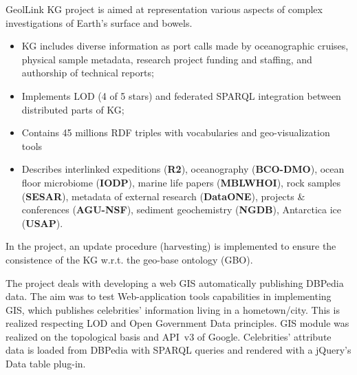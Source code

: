 \documentclass[
]{ceurart}
\begin{document}
  GeolLink KG project \cite{geolink} is aimed at representation various aspects of complex investigations of Earth's surface and bowels.
  \begin{itemize}
  \item KG includes diverse information as port calls made by oceanographic cruises, physical sample metadata, research project funding and staffing, and authorship of technical reports;
  \item Implements LOD (4 of 5 stars) and federated SPARQL integration between distributed parts of KG;
  \item Contains 45 millions RDF triples with vocabularies and geo-visualization tools
  \item Describes interlinked expeditions (\textbf{R2}), oceanography (\textbf{BCO-DMO}), ocean floor microbiome (\textbf{IODP}), marine life papers (\textbf{MBLWHOI}), rock samples (\textbf{SESAR}), metadata of external research (\textbf{DataONE}),  projects \& conferences (\textbf{AGU-NSF}), sediment geochemistry (\textbf{NGDB}), Antarctica ice (\textbf{USAP}).
  \end{itemize}
  In the project, an update procedure (harvesting) is implemented to ensure the consistence of the KG w.r.t. the geo-base ontology (GBO).

   The project \cite{abid} deals with developing a web GIS automatically publishing DBPedia data.  The aim was to test Web-application tools capabilities in implementing GIS, which publishes celebrities' information living in a hometown/city. This is realized respecting LOD and Open Government Data principles.   GIS module was realized on the topological basis and API~v3 of Google. Celebrities' attribute data is loaded from DBPedia with SPARQL queries and rendered with a jQuery's Data table plug-in.
\end{document}
